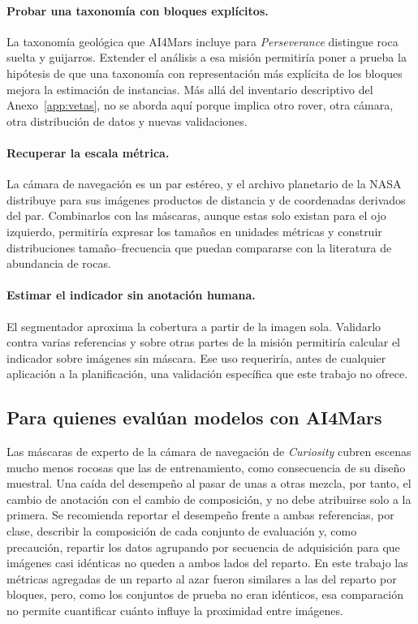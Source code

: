 \paragraph{Probar una taxonomía con bloques explícitos.} La taxonomía geológica que AI4Mars
incluye para \textit{Perseverance} distingue roca suelta y guijarros. Extender el análisis a esa
misión permitiría poner a prueba la hipótesis de que una taxonomía con representación más
explícita de los bloques mejora la estimación de instancias. Más allá del inventario descriptivo
del Anexo~\ref{app:vetas}, no se aborda aquí porque implica otro rover, otra cámara, otra
distribución de datos y nuevas validaciones.

\paragraph{Recuperar la escala métrica.} La cámara de navegación es un par estéreo, y el archivo
planetario de la NASA distribuye para sus imágenes productos de distancia y de coordenadas
derivados del par. Combinarlos con las máscaras, aunque estas solo existan para el ojo
izquierdo, permitiría expresar los tamaños en unidades métricas y construir distribuciones
tamaño--frecuencia que puedan compararse con la literatura de abundancia de rocas.

\paragraph{Estimar el indicador sin anotación humana.} El segmentador aproxima la cobertura a
partir de la imagen sola. Validarlo contra varias referencias y sobre otras partes de la misión
permitiría calcular el indicador sobre imágenes sin máscara. Ese uso
requeriría, antes de cualquier aplicación a la planificación, una validación específica que este
trabajo no ofrece.

\subsection{Para quienes evalúan modelos con AI4Mars}

Las máscaras de experto de la cámara de navegación de \textit{Curiosity} cubren escenas mucho
menos rocosas que las de entrenamiento, como consecuencia de su diseño muestral. Una caída del desempeño al pasar de unas a otras mezcla,
por tanto, el cambio de anotación con el cambio de composición, y no debe atribuirse solo a la
primera. Se recomienda reportar el desempeño frente a ambas referencias, por clase, describir la
composición de cada conjunto de evaluación y, como precaución, repartir los datos agrupando por
secuencia de adquisición para que imágenes casi idénticas no queden a ambos lados del reparto.
En este trabajo las métricas agregadas de un reparto al azar fueron similares a las del reparto
por bloques, pero, como los conjuntos de prueba no eran idénticos, esa comparación no permite
cuantificar cuánto influye la proximidad entre imágenes.

